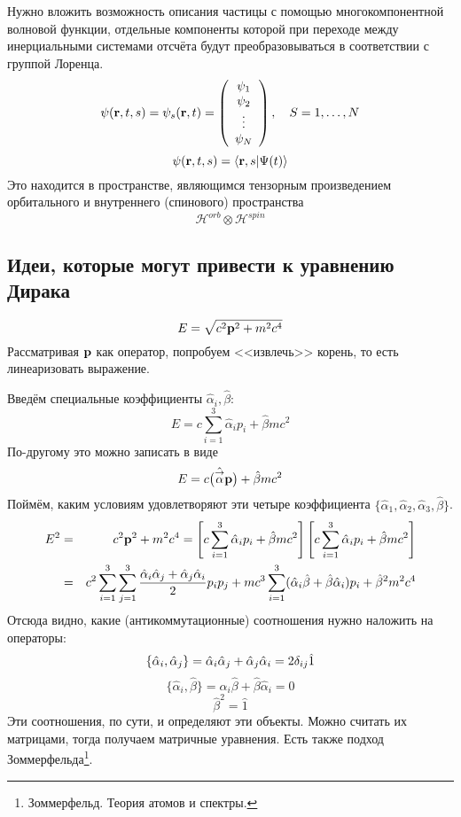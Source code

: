 Нужно вложить возможность описания частицы с помощью многокомпонентной волновой функции, отдельные компоненты которой при переходе между инерциальными системами отсчёта будут преобразовываться в соответствии с группой Лоренца.
$$
    \psi(\bf r, t, s) = \psi_s(\bf r, t) = \left(\begin{array}{c}
                                            \psi_1 \\
                                            \psi_2 \\
                                            \vdots \\
                                            \psi_N
                                          \end{array}\right), \quad S = 1, \ldots, N
$$
$$
    \psi(\bf r, t, s) = \qs{ \bf r, s}{\Psi(t)}
$$
Это находится в пространстве, являющимся тензорным произведением орбитального и внутреннего (спинового) пространства
\def \H{\mathcal H }
$$
    \H^{orb} \otimes \H^{spin}
$$

\subsection{Идеи, которые могут привести к уравнению Дирака}
$$
     E = \sqrt{c^2 \bf p^2 + m^2 c^4}
$$
Рассматривая $\bf p$ как оператор, попробуем <<извлечь>> корень, то есть линеаризовать выражение.

Введём специальные коэффициенты $\hat\alpha_i, \hat\beta$:
$$
    E = c \sum_{i=1}^{3} \hat \alpha_i p_i + \hat \beta m c^2
$$
По-другому это можно записать в виде
$$
    E = c \big(
        \hat{\vec \alpha} \bf p
    \big) + \hat \beta m c^2
$$
Поймём, каким условиям удовлетворяют эти четыре коэффициента $\{\hat \alpha_1,\hat \alpha_2, \hat \alpha_3,\hat \beta\}$.
\begin{eqnarray*}
    E^2 &=& c^2 \bf p^2 + m^2 c^4 = \left[
        c \sum_{i=1}^{3} \hat \alpha_i p_i + \hat \beta m c^2
    \right] \left[
        c \sum_{i=1}^{3} \hat \alpha_i p_i + \hat \beta m c^2
    \right]\\
    &=& c^2 \sum_{i=1}^{3} \sum_{j=1}^{3} \dfrac{\hat \alpha_i \hat \alpha_j + \hat \alpha_j \hat \alpha_i}{2} p_i p_j + mc^3 \sum_{i=1}^{3} (\hat \alpha_i \hat \beta + \hat \beta \hat \alpha_i) p_i + \hat \beta^2 m^2 c^4_{}
\end{eqnarray*}
Отсюда видно, какие (антикоммутационные) соотношения нужно наложить на операторы:
$$
    \{\hat \alpha_i, \hat \alpha_j\} = \hat \alpha_i \hat \alpha_j + \hat \alpha_j \hat \alpha_i = 2 \dta_{ij} \hat 1
$$
$$
    \{\hat \alpha_i, \hat \beta\} = \hat \alpha_i \hat \beta + \hat \beta \hat \alpha_i = 0
$$
$$
    \hat \beta^2 = \hat 1
$$
Эти соотношения, по сути, и определяют эти объекты. Можно считать их матрицами, тогда получаем матричные уравнения. Есть также подход Зоммерфельда\footnote{Зоммерфельд. Теория атомов и спектры.}.

